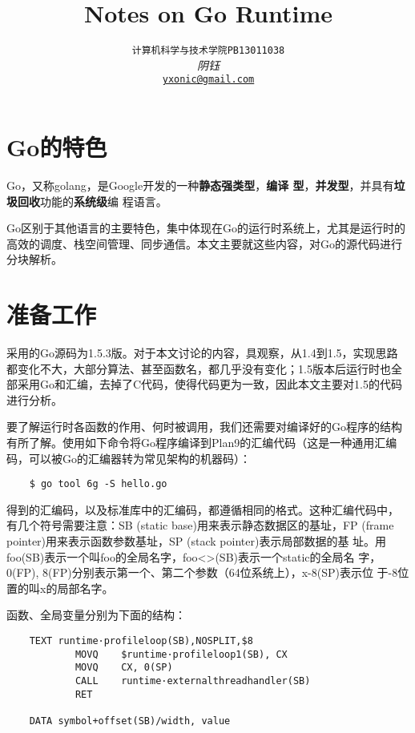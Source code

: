 \documentclass[UTF8,b5paper,fontset=adobe]{ctexart}
\title{\textbf{Notes on Go Runtime}}
\author{\texttt{计算机科学与技术学院\quad PB13011038} \\
  \textit{阴钰} \\
  \texttt{\href{mailto:yxonic@gmail.com}
    {yxonic@gmail.com}}}
\date{}
\begin{document}
\maketitle

\renewcommand\contentsname{目　录}
\tableofcontents

\section{Go的特色}

Go，又称golang，是Google开发的一种\textbf{静态强类型}，\textbf{编译
  型}，\textbf{并发型}，并具有\textbf{垃圾回收}功能的\textbf{系统级}编
程语言\cite{pike2009}。

Go区别于其他语言的主要特色，集中体现在Go的运行时系统上，尤其是运行时的
高效的调度、栈空间管理、同步通信。本文主要就这些内容，对Go的源代码进行
分块解析。

\section{准备工作}

采用的Go源码为1.5.3版。对于本文讨论的内容，具观察，从1.4到1.5，实现思路
都变化不大，大部分算法、甚至函数名，都几乎没有变化；1.5版本后运行时也全
部采用Go和汇编，去掉了C代码，使得代码更为一致，因此本文主要对1.5的代码
进行分析。

要了解运行时各函数的作用、何时被调用，我们还需要对编译好的Go程序的结构
有所了解。使用如下命令将Go程序编译到Plan9的汇编代码（这是一种通用汇编
码，可以被Go的汇编器转为常见架构的机器码）：

\begin{verbatim}
    $ go tool 6g -S hello.go
\end{verbatim}

得到的汇编码，以及标准库中的汇编码，都遵循相同的格式。这种汇编代码中，
有几个符号需要注意：SB (static base)用来表示静态数据区的基址，FP
(frame pointer)用来表示函数参数基址，SP (stack pointer)表示局部数据的基
址。用foo(SB)表示一个叫foo的全局名字，foo<>(SB)表示一个static的全局名
字，0(FP), 8(FP)分别表示第一个、第二个参数（64位系统上），x-8(SP)表示位
于-8位置的叫x的局部名字。

函数、全局变量分别为下面的结构：

\begin{verbatim}
    TEXT runtime·profileloop(SB),NOSPLIT,$8
            MOVQ    $runtime·profileloop1(SB), CX
            MOVQ    CX, 0(SP)
            CALL    runtime·externalthreadhandler(SB)
            RET
        
    DATA symbol+offset(SB)/width, value
\end{verbatim}
\end{document}

